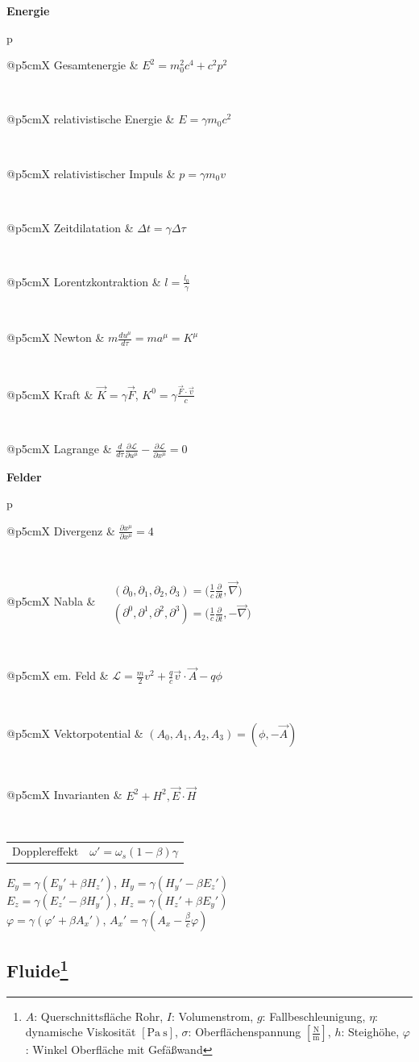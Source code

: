 \documentclass[12pt,a4paper, twoside]{article}
\makeatletter
\renewcommand{\d}[2]{\frac{d #1}{d #2}}
\newcommand{\pd}[2]{\frac{\partial #1}{\partial #2}}
\renewcommand{\=}[1]{\stackrel{#1}{=}}
\theoremstyle{definition}
\theoremstyle{remark}
\newcommand{\concept}[2]{%
\noindent
\begin{framed}
\noindent\textbf{#1}
\par\begin{tabular}{p{\linewidth}}
#2
\end{tabular}
\end{framed}
}
\newcommand{\f}[2]{%
\noindent\begin{tabularx}{\linewidth}{@{}p{5cm}X}
#1 & $#2$
\end{tabularx}}
\makeatother
\begin{document}
\concept{Energie}{

\f{Gesamtenergie}{E^2 = m_0^2 c^4 + c^2p^2}\\
\f{relativistische Energie}{E = \gamma m_0 c^2}\\
\f{relativistischer Impuls}{p = \gamma m_0 v}\\
\f{Zeitdilatation}{\Delta t = \gamma \Delta \tau}\\
\f{Lorentzkontraktion}{l = \frac{l_0}{\gamma}}\\
\f{Newton}{m \d{u^{\mu}}{\tau} = ma^{\mu} = K^{\mu}}\\
\f{Kraft}{\vec{K} = \gamma \vec{F}$, $K^0 = \gamma \frac{\vec{F} \cdot \vec{v}}{c}}\\
\f{Lagrange}{\d{}{\tau} \pd{\mathscr{L}}{u^{\mu}} - \pd{\mathscr{L}}{x^{\mu}} = 0}
}

\concept{Felder}{

\f{Divergenz}{\pd{x^{\mu}}{x^{\mu}} = 4}\\
\f{Nabla}{\begin{aligned} &(\partial_0, \partial_1, \partial_2, \partial_3) = \Big(\frac{1}{c} \pd{}{t}, \vec{\nabla}\Big)\\
&(\partial^0, \partial^1, \partial^2, \partial^3) = \Big(\frac{1}{c} \pd{}{t}, -\vec{\nabla}\Big)\end{aligned}}\\
\f{em. Feld}{\mathscr{L} = \frac{m}{2} v^2 + \frac{q}{c} \vec{v} \cdot \vec{A} - q \phi}\\
\f{Vektorpotential}{(A_0, A_1, A_2, A_3) = (\phi, - \vec{A})}\\
\f{Invarianten}{E^2 + H^2, \vec E \cdot \vec H}\\
\f{Dopplereffekt}{\omega' = \omega_s (1-\beta)\gamma}

\begin{center}
\begin{framed}
$E_y = \gamma (E_y' + \beta H_z')$, $H_y = \gamma (H_y' - \beta E_z')$\\
$E_z = \gamma (E_z' - \beta H_y')$, $H_z = \gamma (H_z' + \beta E_y')$\\
$\varphi = \gamma(\varphi' + \beta A_x')$, $A_x' = \gamma(A_x - \frac{\beta}{c} \varphi)$
\end{framed}
\end{center}
}



\subsection[Fluide]{Fluide\let\thefootnote\relax\footnote{$A$: Querschnittsfläche Rohr, $I$: Volumenstrom, $g$: Fallbeschleunigung, $\eta$: dynamische Viskosität $[\text{Pa}~\text{s}]$, $\sigma$: Oberflächenspannung $[\frac{\text{N}}{\text{m}}]$, $h$: Steighöhe, $\varphi$: Winkel Oberfläche mit Gefäßwand}}
\end{document}
